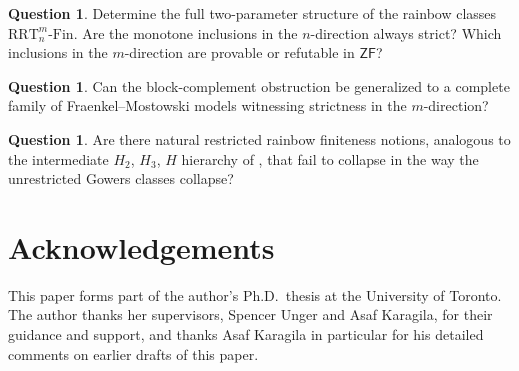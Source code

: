 \documentclass[10pt,a4paper]{amsart}
\theoremstyle{definition}
\newtheorem{question}[theorem]{Question}
\newcommand{\ZF}{\mathsf{ZF}}
\newcommand{\RRT}{\mathrm{RRT}}
\newcommand{\RRTFin}[2]{\RRT^{#1}_{#2}\text{-}\mathrm{Fin}}
\begin{document}
\begin{question}
Determine the full two-parameter structure of the rainbow classes \(\RRTFin{m}{n}\).  Are the monotone inclusions in the \(n\)-direction always strict?  Which inclusions in the \(m\)-direction are provable or refutable in \(\ZF\)?
\end{question}

\begin{question}
Can the block-complement obstruction be generalized to a complete family of Fraenkel--Mostowski models witnessing strictness in the \(m\)-direction?
\end{question}

\begin{question}
Are there natural restricted rainbow finiteness notions, analogous to the intermediate \(H_2\), \(H_3\), \(H\) hierarchy of \cite{BCF}, that fail to collapse in the way the unrestricted Gowers classes collapse?
\end{question}

\section*{Acknowledgements}

This paper forms part of the author's Ph.D.\ thesis at the University of Toronto.  The author thanks her supervisors, Spencer Unger and Asaf Karagila, for their guidance and support, and thanks Asaf Karagila in particular for his detailed comments on earlier drafts of this paper.




\end{document}
